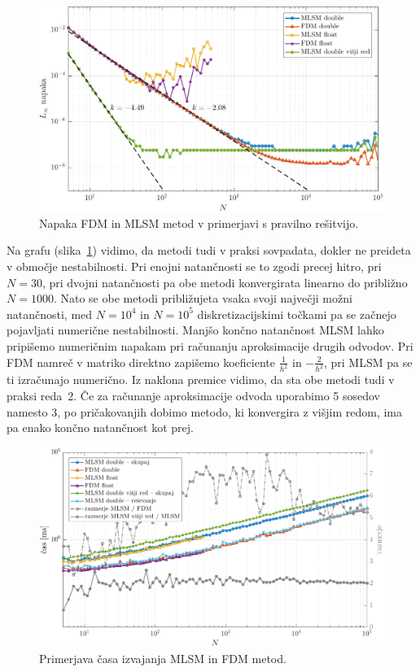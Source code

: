 \documentclass[12pt,a4paper,twoside]{article}
\theoremstyle{definition} %
\theoremstyle{plain} %
\numberwithin{equation}{section}
\newlength{\iw}
\begin{document}
\begin{figure}[h]
  \centering
  \includegraphics[width=\iw]{images/lap1d_convergence.pdf}
  \caption[Napaka FDM in MLSM metod.]{Napaka FDM in MLSM metod v primerjavi s pravilno rešitvijo.}
  \label{fig:mlsm-fdm-err}
\end{figure}

Na grafu (slika~\ref{fig:mlsm-fdm-err}) vidimo, da metodi tudi v praksi sovpadata, dokler ne
preideta v območje nestabilnosti. Pri enojni natančnosti se to zgodi precej hitro, pri $N = 30$, pri
dvojni natančnosti pa obe metodi konvergirata linearno do približno $N = 1000$. Nato se obe metodi
približujeta vsaka svoji največji možni natančnosti, med $N = 10^4$ in $N = 10^5$ diskretizacijskimi
točkami pa se začnejo pojavljati numerične nestabilnosti. Manjšo končno natančnost MLSM lahko
pripišemo numeričnim napakam pri računanju aproksimacije drugih odvodov. Pri FDM namreč v matriko
direktno zapišemo koeficiente $\frac{1}{h^2}$ in $-\frac{2}{h^2}$, pri MLSM pa se ti izračunajo
numerično. Iz naklona premice vidimo, da sta obe metodi tudi v praksi reda~2. Če za računanje
aproksimacije odvoda uporabimo 5 sosedov namesto 3, po pričakovanjih dobimo metodo, ki konvergira z
višjim redom, ima pa enako končno natančnost kot prej.

\begin{figure}[h]
  \centering
  \includegraphics[width=\iw]{images/lap1d_times.pdf}
  \caption{Primerjava časa izvajanja MLSM in FDM metod.}
  \label{fig:mlsm-fdm-time}
\end{figure}
\end{document}
